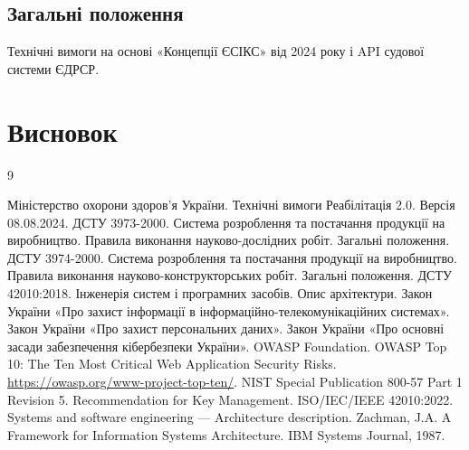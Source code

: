 \documentclass{article}
\begin{document}
\subsection*{Загальні положення}

Технічні вимоги на основі «Концепції ЄСІКС» від 2024 року \cite{esiks} і API судової системи ЄДРСР\cite{eCourt}.

\newpage
\section*{Висновок}

\begin{thebibliography}{9}

 Міністерство охорони здоров’я України. \newblock Технічні вимоги Реабілітація 2.0. \newblock Версія 08.08.2024.
 ДСТУ 3973-2000. \newblock Система розроблення та постачання продукції на виробництво. Правила виконання науково-дослідних робіт. Загальні положення.
 ДСТУ 3974-2000. \newblock Система розроблення та постачання продукції на виробництво. Правила виконання науково-конструкторських робіт. Загальні положення.
 ДСТУ 42010:2018. \newblock Інженерія систем і програмних засобів. Опис архітектури.
 Закон України «Про захист інформації в інформаційно-телекомунікаційних системах».
 Закон України «Про захист персональних даних».
 Закон України «Про основні засади забезпечення кібербезпеки України».
 OWASP Foundation. \newblock OWASP Top 10: The Ten Most Critical Web Application Security Risks. \newblock \url{https://owasp.org/www-project-top-ten/}.
 NIST Special Publication 800-57 Part 1 Revision 5. \newblock Recommendation for Key Management.
 ISO/IEC/IEEE 42010:2022. \newblock Systems and software engineering — Architecture description.
 Zachman, J.A. \newblock A Framework for Information Systems Architecture. \newblock IBM Systems Journal, 1987.

\end{thebibliography}
\end{document}
